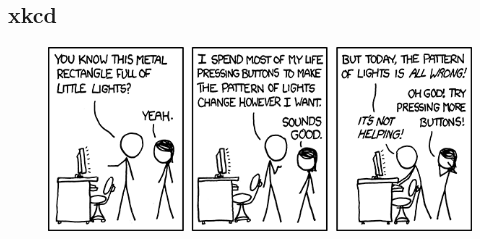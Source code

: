 \documentclass{beamer}
\begin{document}
\subsection{xkcd}
\begin{frame}[plain]
  \begin{figure}
    \begin{center}
      \includegraphics[width=320pt]{computer_problems}
    \end{center}
  \end{figure}
\end{frame}
\end{document}
